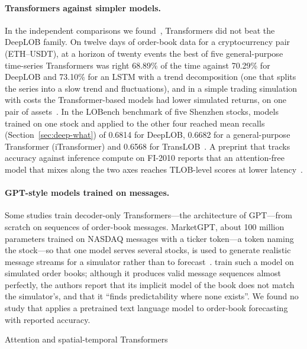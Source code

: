 \paragraph{Transformers against simpler models.} In the independent comparisons we
found~\citep{bilokon2023transformers,zhong2025lobench}, Transformers did not beat the DeepLOB family. On twelve days of order-book data for a cryptocurrency pair (ETH--USDT), at a horizon of twenty events the best of five general-purpose
time-series Transformers was right 68.89\% of the time
against 70.29\% for DeepLOB and 73.10\% for an LSTM with a trend decomposition (one that splits the series into a
slow trend and fluctuations), and in a simple trading
simulation with costs the Transformer-based models had lower simulated returns, on one pair of assets~\citep{bilokon2023transformers}. In the LOBench benchmark of five Shenzhen stocks, models trained on one stock and
applied to the other four reached mean recalls (Section~\ref{sec:deep-what}) of 0.6814 for DeepLOB, 0.6682 for a general-purpose Transformer
(iTransformer) and 0.6568 for TransLOB~\citep{zhong2025lobench}. A preprint that tracks accuracy against inference compute on FI-2010
reports that an attention-free model that mixes along the two axes reaches TLOB-level scores at lower
latency~\citep{hedges2026frontier}.

\paragraph{GPT-style models trained on messages.} Some studies train decoder-only Transformers---the
architecture of GPT---from scratch on sequences of order-book messages. MarketGPT, about 100 million
parameters trained on NASDAQ messages with a ticker token---a token naming the stock---so that one model serves several
stocks, is used
to generate realistic message streams for a simulator rather than to forecast~\citep{wheeler2024marketgpt}.
\citet{llmlob2026} train such a model on simulated order books; although it produces valid
message sequences almost perfectly, the authors report that its implicit model of the book does not match the
simulator's, and that it ``finds predictability where none exists''. We found no study that applies a pretrained text language model to order-book
forecasting with reported accuracy.

\begin{modelcard}{Attention and spatial-temporal Transformers}
\end{modelcard}

